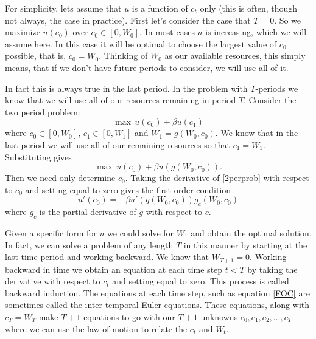 For simplicity, lets assume that $u$ is a function of $c_t$ only (this is often, though not always, the case in practice).  First let's consider the case that $T=0$.  So we maximize $u(c_0)$ over $c_0 \in [0,W_0]$.  In most cases $u$ is increasing, which we will assume here.  In this case it will be optimal to choose the largest value of $c_0$ possible, that is, $c_0 = W_0$.  Thinking of $W_0$ as our available resources, this simply means, that if we don't have future periods to consider, we will use all of it.

In fact this is always true in the last period.  In the problem with $T$-periods we know that we will use all of our resources remaining in period $T$.  Consider the two period problem:
\begin{equation}
\label{2perprob}
\max \, u(c_0) + \beta u(c_1)
\end{equation}
where $c_0 \in [0,W_0]$, $c_1 \in [0,W_1]$ and $W_1 = g(W_0,c_0)$.  We know that in the last period we will use all of our remaining resources so that $c_1 = W_1$.  Substituting gives
\begin{equation*}
\max \, u(c_0) + \beta u(g(W_0,c_0)).
\end{equation*}
Then we need only determine $c_0$.  Taking the derivative of \eqref{2perprob} with respect to $c_0$ and setting equal to zero gives the first order condition
\begin{equation}
\label{FOC}
u'(c_0) = -\beta u'(g(W_0,c_0))g_c(W_0,c_0)
\end{equation}
where $g_c$ is the partial derivative of $g$ with respect to $c$.

Given a specific form for $u$ we could solve for $W_1$ and obtain the optimal solution.  In fact, we can solve a problem of any length $T$ in this manner by starting at the last time period and working backward.  We know that $W_{T+1} = 0$.  Working backward in time we obtain an equation at each time step $t<T$ by taking the derivative with respect to $c_t$ and setting equal to zero.  This process is called backward induction.  The equations at each time step, such as equation \eqref{FOC} are sometimes called the inter-temporal Euler equations.  These equations, along with $c_T = W_T$ make $T+1$ equations to go with our $T+1$ unknowns $c_0,c_1,c_2,\ldots,c_T$ where we can use the law of motion to relate the $c_t$ and $W_t$.

